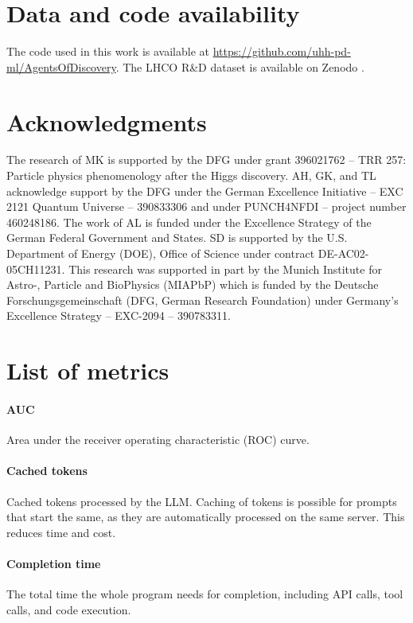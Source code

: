 \documentclass[submission, Phys]{SciPost}
\begin{document}
\section*{Data and code availability}
\label{sec:data_code_availability}
The code used in this work is available at \url{https://github.com/uhh-pd-ml/AgentsOfDiscovery}. The LHCO R\&D dataset is available on Zenodo \cite{gregor_kasieczka_2019_6466204}.

\section*{Acknowledgments}

The research of MK is supported by the DFG under grant 396021762 – TRR 257: Particle physics phenomenology after the Higgs discovery. AH, GK, and TL acknowledge support by the DFG under the German Excellence Initiative – EXC 2121 Quantum Universe – 390833306 and under PUNCH4NFDI – project number 460248186. The work of AL is funded under the Excellence Strategy of the German Federal Government and States. SD is supported by the U.S. Department of Energy (DOE), Office of Science under contract DE-AC02-05CH11231. This research was supported in part by the Munich Institute for Astro-, Particle and BioPhysics (MIAPbP) which is funded by the Deutsche Forschungsgemeinschaft (DFG, German Research Foundation) under Germany's Excellence Strategy – EXC-2094 – 390783311. 

\clearpage


\appendix

\section{List of metrics}
\label{app:metrics}
\paragraph{AUC} Area under the receiver operating characteristic (ROC) curve.

\paragraph{Cached tokens} Cached tokens processed by the LLM. Caching of tokens is possible for prompts that start the same, as they are automatically processed on the same server. This reduces time and cost. 

\paragraph{Completion time} The total time the whole program needs for completion, including API calls, tool calls, and code execution.
\end{document}
